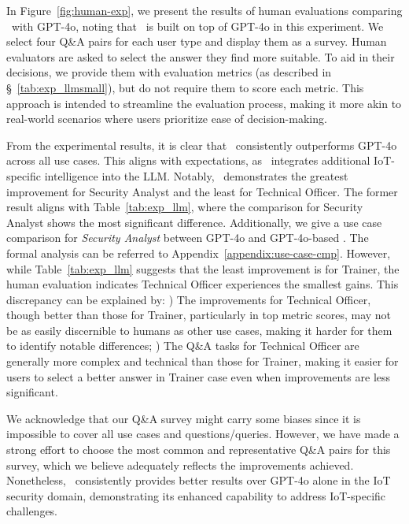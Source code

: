 In Figure~\ref{fig:human-exp}, we present the results of human evaluations comparing \chatiot\ with GPT-4o, noting that \chatiot\ is built on top of GPT-4o in this experiment. We select four Q\&A pairs for each user type and display them as a survey. 
Human evaluators are asked to select the answer they find more suitable. 
To aid in their decisions, we provide them with evaluation metrics (as described in \S~\ref{tab:exp_llmsmall}), but do not require them to score each metric. 
This approach is intended to streamline the evaluation process, making it more akin to real-world scenarios where users prioritize ease of decision-making.

From the experimental results, it is clear that \chatiot\ consistently outperforms GPT-4o across all use cases. This aligns with expectations, as \chatiot\ integrates additional IoT-specific intelligence into the LLM. Notably, \chatiot\ demonstrates the greatest improvement for Security Analyst and the least for Technical Officer. The former result aligns with Table~\ref{tab:exp_llm}, where the comparison for Security Analyst shows the most significant difference.
Additionally, we give a use case comparison for \textit{Security Analyst} between GPT-4o and GPT-4o-based \chatiot. The formal analysis can be referred to Appendix~\ref{appendix:use-case-cmp}.
However, while Table~\ref{tab:exp_llm} suggests that the least improvement is for Trainer, the human evaluation indicates Technical Officer experiences the smallest gains. This discrepancy can be explained by: ) The improvements for Technical Officer, though better than those for Trainer, particularly in top metric scores, may not be as easily discernible to humans as other use cases, making it harder for them to identify notable differences; ) The Q\&A tasks for Technical Officer are generally more complex and technical than those for Trainer, making it easier for users to select a better answer in Trainer case even when improvements are less significant.

We acknowledge that our Q\&A survey might carry some biases since it is impossible to cover all use cases and questions/queries. However, we have made a strong effort to choose the most common and representative Q\&A pairs for this survey, which we believe adequately reflects the improvements achieved.
Nonetheless, \chatiot\ consistently provides better results over GPT-4o alone in the IoT security domain, demonstrating its enhanced capability to address IoT-specific challenges.










